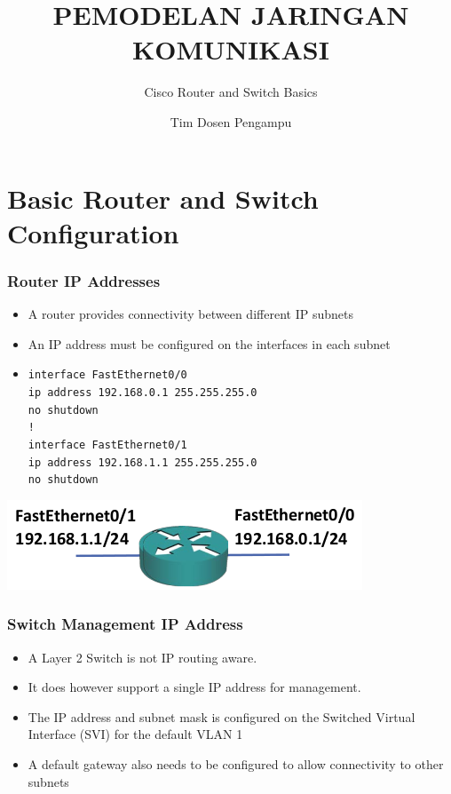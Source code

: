 \documentclass[pdflatex,compress,mathserif]{beamer}
\title{PEMODELAN JARINGAN KOMUNIKASI}
\subtitle{Cisco Router and Switch Basics}
\author{Tim Dosen Pengampu}
\begin{document}
\maketitle

\section{Basic Router and Switch Configuration}

\begin{frame}
	\frametitle{Router IP Addresses}
	\begin{itemize}
		\item A router provides connectivity between different IP subnets
		\item An IP address must be configured on the interfaces in each subnet
		\item[] \texttt{interface FastEthernet0/0 \\
			ip address 192.168.0.1 255.255.255.0 \\
			no shutdown \\
			! \\
			interface FastEthernet0/1 \\
			ip address 192.168.1.1 255.255.255.0 \\
			no shutdown}
	\end{itemize}
	\begin{center}
		\includegraphics[width=0.4\linewidth]{img/img01}
	\end{center}
\end{frame}

\begin{frame}
	\frametitle{Switch Management IP Address}
	\begin{itemize}
		\item A Layer 2 Switch is not IP routing aware.
		\item It does however support a single IP address for management.
		\item The IP address and subnet mask is configured on the Switched Virtual Interface (SVI) for the default VLAN 1
		\item A default gateway also needs to be configured to allow connectivity to other subnets
	\end{itemize}
\end{frame}
\end{document}
